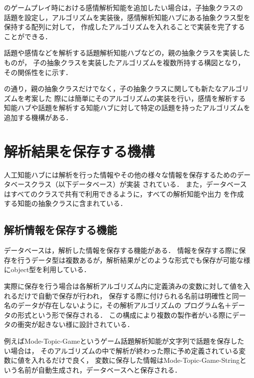 のゲームプレイ時における感情解析知能を追加したい場合は，子抽象クラスの
話題を設定し，アルゴリズムを実装後，感情解析知能ハブにある抽象クラス型を保持する配列に対して，
作成したアルゴリズムを入れることで実装を完了することができる．

話題や感情などを解析する話題解析知能ハブなどの，親の抽象クラスを実装したものが，
子の抽象クラスを実装したアルゴリズムを複数所持する構図となり，その関係性をに示す．


の通り，親の抽象クラスだけでなく，子の抽象クラスに関しても新たなアルゴリズムを考案した
際には簡単にそのアルゴリズムの実装を行い，感情を解析する
知能ハブや話題を解析する知能ハブに対して特定の話題を持ったアルゴリズムを追加する機構がある．

\newpage

\section{解析結果を保存する機構}
人工知能ハブには解析を行った情報やその他の様々な情報を保存するためのデータベースクラス（以下データベース）が実装
されている．
また，データベースはすべてのクラスで共有で利用できるように，すべての解析知能や出力
を作成する知能の抽象クラスに含まれている．

\subsection{解析情報を保存する機能}
データベースは，解析した情報を保存する機能がある．
情報を保存する際に保存を行うデータ型は複数あるが，解析結果がどのような形式でも保存が可能な様にobject型を利用している．

実際に保存を行う場合は各解析アルゴリズム内に定義済みの変数に対して値を入れるだけで自動で保存が行われ，
保存する際に付けられる名前は明確性と同一名のデータが存在しないように，その解析アルゴリズムの
プログラム名＋データの形式という形で保存される．
この構成により複数の製作者がいる際にデータの衝突が起きない様に設計されている．

例えばMode-Topic-Gameというゲーム話題解析知能が文字列で話題を保存したい場合は，
そのアルゴリズムの中で解析が終わった際に予め定義されている変数に値を入れるだけで良く，
変数に保存した情報はMode-Topic-Game-Stringという名前が自動生成され，データベースへと保存される．

